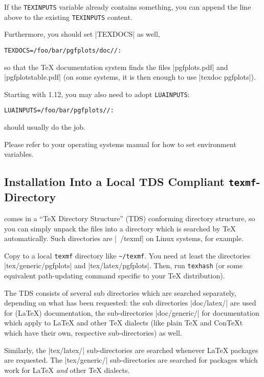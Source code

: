 If the \texttt{TEXINPUTS} variable already contains something, you can append
the line above to the existing \texttt{TEXINPUTS} content.

Furthermore, you should set |TEXDOCS| as well,
%
\begin{verbatim}
TEXDOCS=/foo/bar/pgfplots/doc//:
\end{verbatim}
%
so that the \TeX{} documentation system finds the files |pgfplots.pdf| and
|pgfplotstable.pdf| (on some systems, it is then enough to use
|texdoc pgfplots|).

Starting with \PGFPlots{} 1.12, you may also need to adopt \texttt{LUAINPUTS}:
%
\begin{verbatim}
LUAINPUTS=/foo/bar/pgfplots//:
\end{verbatim}
%
should usually do the job.

Please refer to your operating systems manual for how to set environment
variables.


\subsection{Installation Into a Local TDS Compliant \texttt{texmf}-Directory}
\label{pgfplots:tds}

\PGFPlots{} comes in a ``\TeX{} Directory Structure'' (TDS) conforming
directory structure, so you can simply unpack the files into a directory which
is searched by \TeX{} automatically. Such directories are |~/texmf| on Linux
systems, for example.

Copy \PGFPlots{} to a local \texttt{texmf} directory like \lstinline!~/texmf!.
You need at least the \PGFPlots{} directories |tex/generic/pgfplots| and
|tex/latex/pgfplots|. Then, run \lstinline!texhash! (or some equivalent
path-updating command specific to your \TeX{} distribution).

The TDS consists of several sub directories which are searched separately,
depending on what has been requested: the sub directories
|doc/latex/| are used for (\LaTeX{}) documentation, the
sub-directories |doc/generic/| for documentation which apply to
\LaTeX{} and other \TeX{} dialects (like plain \TeX{} and Con\TeX{}t which have
their own, respective sub-directories) as well.

Similarly, the |tex/latex/| sub-directories are searched whenever
\LaTeX{} packages are requested. The |tex/generic/|
sub-directories are searched for packages which work for \LaTeX{} \emph{and}
other \TeX{} dialects.

